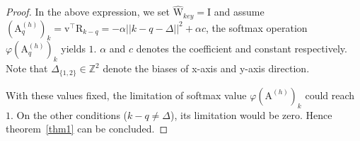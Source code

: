 \documentclass[journal]{IEEEtran}
\newcommand{\br}[1]{\bm{\mathrm{#1}}}
\newtheorem{proof}{Proof}[section]
\begin{document}
\begin{proof}
In the above expression, we set $\widehat{\br{W}}_{key} = \br{I}$ and assume $(\br{A}^{(h)}_{q})_{k}=\br{v}^{\top}\br{R}_{k-q}=-\alpha||k-q-\Delta||^2+\alpha c$, the softmax operation $ \varphi (\br{A}^{(h)}_{q})_{k} $ yields $1$. $\alpha$ and $c$ denotes the coefficient and constant respectively.
Note that $\Delta_{\{1,2\}} \in \mathbb{Z}^2$ denote the biases of x-axis and y-axis direction.

With these values fixed, the limitation of softmax value $\varphi (\br{A}^{(h)})_{k} $ could reach $1$. On the other conditions ($k-q \ne \Delta$), its limitation would be zero. Hence theorem~\ref{thm1} can be concluded.
\end{proof}


\balance
\end{document}
